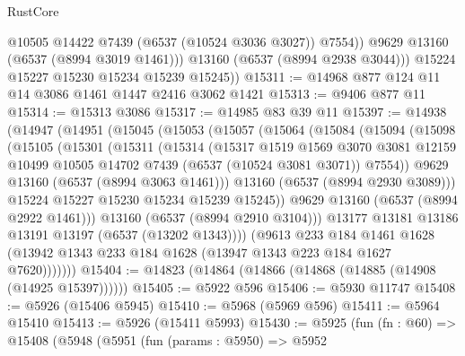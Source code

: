 \begin{lexlean}{RustCore}
\begin{coremodule}
                @10505
                @14422
                @7439
                (@6537 (@10524 @3036 @3027))
                @7554))
            @9629
            @13160
            (@6537 (@8994 @3019 @1461)))
          @13160
          (@6537 (@8994 @2938 @3044)))
        @15224
        @15227
        @15230
        @15234
        @15239
        @15245))
@15311 := @14968 @877 @124 @11 @14 @3086 @1461 @1447 @2416 @3062 @1421
@15313 := @9406 @877 @11
@15314 := @15313 @3086
@15317 := @14985 @83 @39 @11
@15397 := @14938
    (@14947
      (@14951
        (@15045
          (@15053
            (@15057
              (@15064
                (@15084
                  (@15094
                    (@15098
                      (@15105
                        (@15301
                          (@15311
                            (@15314
                              (@15317
                                @1519
                                @1569
                                @3070
                                @3081
                                @12159
                                @10499
                                @10505
                                @14702
                                @7439
                                (@6537 (@10524 @3081 @3071))
                                @7554))
                            @9629
                            @13160
                            (@6537 (@8994 @3063 @1461)))
                          @13160
                          (@6537 (@8994 @2930 @3089)))
                        @15224
                        @15227
                        @15230
                        @15234
                        @15239
                        @15245))
                    @9629
                    @13160
                    (@6537 (@8994 @2922 @1461)))
                  @13160
                  (@6537 (@8994 @2910 @3104)))
                @13177
                @13181
                @13186
                @13191
                @13197
                (@6537 (@13202 @1343))))
            (@9613
              @233
              @184
              @1461
              @1628
              (@13942 @1343 @233 @184 @1628 (@13947 @1343 @223 @184 @1627 @7620)))))))
@15404 := @14823 (@14864 (@14866 (@14868 (@14885 (@14908 (@14925 @15397))))))
@15405 := @5922 @596
@15406 := @5930 @11747
@15408 := @5926 (@15406 @5945)
@15410 := @5968 (@5969 @596)
@15411 := @5964 @15410
@15413 := @5926 (@15411 @5993)
@15430 := @5925
    (fun (fn : @60) =>
    @15408
      (@5948
        (@5951
          (fun (params : @5950) =>
          @5952

\end{coremodule}
\end{lexlean}
